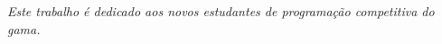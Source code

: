 \begin{dedicatoria}
   \vspace*{\fill}
   \centering
   \noindent

   \textit{Este trabalho é dedicado aos novos estudantes de programação competitiva do gama.} \vspace*{\fill}

\end{dedicatoria}
